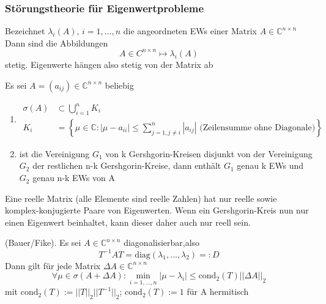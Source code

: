 \documentclass[
	ngerman,
	accentcolor=9c,%
	type=intern,
	marginpar=false
	]{tudapub}
\begin{document}
            \subsubsection{Störungstheorie für Eigenwertprobleme}
                \begin{satz}
                    Bezeichnet $\lambda_i(A)$, $i = 1, \dots, n$ die angeordneten EWs einer Matrix $A \in \mathbb{C}^{n\times n}$
                    Dann sind die Abbildungen 
                    \begin{equation*}
                        A \in C^{n\times n} \mapsto \lambda_i (A)
                    \end{equation*}
                    stetig. Eigenwerte hängen also stetig von der Matrix ab
                \end{satz}
                \newpage
                \begin{satz}
                    Es sei $A= (a_{ij}) \in \mathbb{C}^{n\times n}$ beliebig
                    \begin{enumerate}[label=\alph*)]
                        \item \begin{align*}
                            \sigma(A) &\subset \bigcup_{i=1}^n K_i\\
                            K_i &= \left\{\mu \in \mathbb{C} : |\mu - a_{ii}| \leq \sum_{j = 1, j \not = i}^n|a_{ij}|\text{ (Zeilensumme ohne Diagonale)}\right\}
                        \end{align*}
                        \item ist die Vereinigung $G_1$ von k Gershgorin-Kreisen disjunkt von der Vereinigung $G_2$ der restlichen n-k Gershgorin-Kreise, dann enthält $G_1$ genau k EWs und $G_2$ genau n-k EWs von A
                    \end{enumerate}
                    Eine reelle Matrix (alle Elemente sind reelle Zahlen) hat nur reelle sowie komplex-konjugierte Paare von Eigenwerten. Wenn ein Gershgorin-Kreis nun nur einen Eigenwert beinhaltet, kann dieser daher auch nur reell sein.
                \end{satz}
                \begin{satz}
                    (Bauer/Fike). Es sei $A \in \mathbb{C}^{n \times n}$ diagonalisierbar,also
                    \begin{equation*}
                        T^{-1}AT = \text{diag}(\lambda_1, \dots, \lambda_2) =: D
                    \end{equation*}
                    Dann gilt für jede Matrix $\Delta A \in \mathbb{C}^{n \times n}$
                    \begin{equation*}
                        \forall \mu \in \sigma(A+\Delta A): \min_{i=1,\dots,n} |\mu - \lambda_i| \leq \text{cond}_2(T)||\Delta A||_2
                    \end{equation*}
                    mit $\text{cond}_2(T):= ||T||_2||T^{-1}||_2$; $\text{cond}_2(T):= 1$ für A hermitisch 
                \end{satz}
\end{document}

